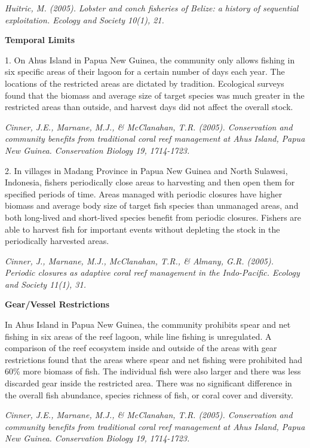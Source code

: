 \documentclass[]{book}
\begin{document}
\emph{Huitric, M. (2005). Lobster and conch fisheries of Belize: a
history of sequential exploitation. Ecology and Society 10(1), 21.}

\textbf{Temporal Limits}

1. On Ahus Island in Papua New Guinea, the community only allows fishing
in six specific areas of their lagoon for a certain number of days each
year. The locations of the restricted areas are dictated by tradition.
Ecological surveys found that the biomass and average size of target
species was much greater in the restricted areas than outside, and
harvest days did not affect the overall stock.

\emph{Cinner, J.E., Marnane, M.J., \& McClanahan, T.R. (2005).
Conservation and community benefits from traditional coral reef
management at Ahus Island, Papua New Guinea. Conservation Biology 19,
1714-1723.}

2. In villages in Madang Province in Papua New Guinea and North
Sulawesi, Indonesia, fishers periodically close areas to harvesting and
then open them for specified periods of time. Areas managed with
periodic closures have higher biomass and average body size of target
fish species than unmanaged areas, and both long-lived and short-lived
species benefit from periodic closures. Fishers are able to harvest fish
for important events without depleting the stock in the periodically
harvested areas.

\emph{Cinner, J., Marnane, M.J., McClanahan, T.R., \& Almany, G.R.
(2005). Periodic closures as adaptive coral reef management in the
Indo-Pacific. Ecology and Society 11(1), 31.}

\textbf{Gear/Vessel Restrictions}

In Ahus Island in Papua New Guinea, the community prohibits spear and
net fishing in six areas of the reef lagoon, while line fishing is
unregulated. A comparison of the reef ecosystem inside and outside of
the areas with gear restrictions found that the areas where spear and
net fishing were prohibited had 60\% more biomass of fish. The
individual fish were also larger and there was less discarded gear
inside the restricted area. There was no significant difference in the
overall fish abundance, species richness of fish, or coral cover and
diversity.

\emph{Cinner, J.E., Marnane, M.J., \& McClanahan, T.R. (2005).
Conservation and community benefits from traditional coral reef
management at Ahus Island, Papua New Guinea. Conservation Biology 19,
1714-1723.}
\end{document}
